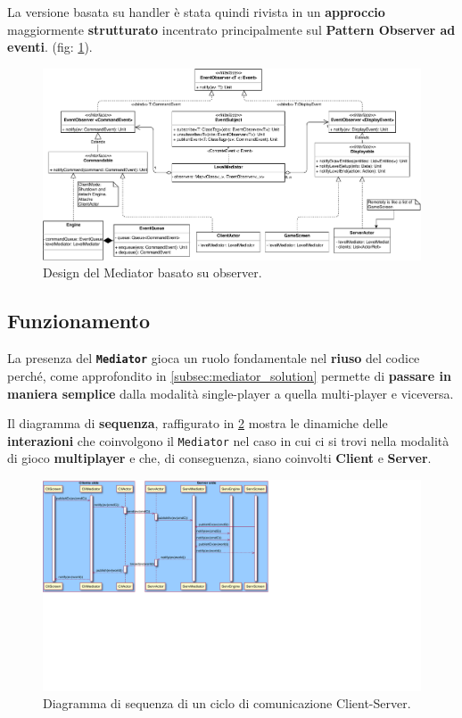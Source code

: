 La versione basata su handler è stata quindi rivista in un \textbf{approccio} maggiormente \textbf{strutturato} incentrato principalmente sul \textbf{Pattern Observer ad eventi}. (fig: \ref{fig:mediatorObserver}).
\begin{figure}[H]
	\centering
	\includegraphics[width=0.99\columnwidth]{drawio/mediator/mediatorObserver.pdf}
	\caption{Design del Mediator basato su observer.}
	\label{fig:mediatorObserver}
\end{figure}

\subsection{Funzionamento}

La presenza del \textbf{\texttt{Mediator}} gioca un ruolo fondamentale nel \textbf{riuso} del codice perché, come approfondito in \ref{subsec:mediator_solution} permette di \textbf{passare in maniera semplice} dalla modalità single-player a quella multi-player e viceversa.

Il diagramma di \textbf{sequenza}, raffigurato in \ref{fig:sequenceMediator} mostra le dinamiche delle \textbf{interazioni} che coinvolgono il \texttt{Mediator} nel caso in cui ci si trovi nella modalità di gioco \textbf{multiplayer} e che, di conseguenza, siano coinvolti \textbf{Client} e \textbf{Server}.

\begin{figure}[H]
	\centering
	\includegraphics[width=0.99\columnwidth]{plantuml/rendered/sequenceDiagrams/sequenceMediator.pdf}
	\caption{Diagramma di sequenza di un ciclo di comunicazione Client-Server.}
	\label{fig:sequenceMediator}
\end{figure}

